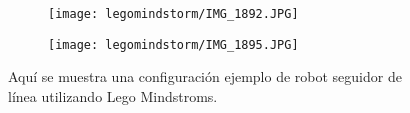\begin{figure}[H]
  \begin{subfigure}{.5\textwidth}
    \texttt{[image: legomindstorm/IMG\_1892.JPG]}
  \end{subfigure}
  \begin{subfigure}{.5\textwidth}
    \texttt{[image: legomindstorm/IMG\_1895.JPG]}
  \end{subfigure}
  \caption{Aquí se muestra una configuración ejemplo de robot seguidor de línea utilizando Lego Mindstroms.}
  \label{fig:P10robot}
\end{figure}
